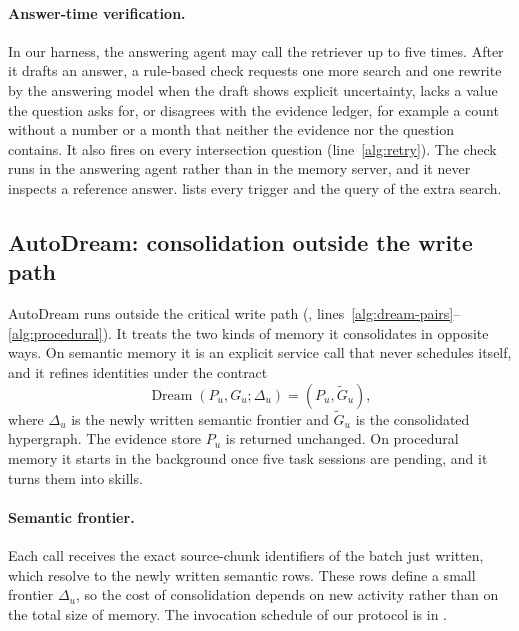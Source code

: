 \paragraph{Answer-time verification.}
In our harness, the answering agent may call the retriever up to five times.
After it drafts an answer, a rule-based check requests one more search and one
rewrite by the answering model when the draft shows explicit uncertainty, lacks a value the question asks for,
or disagrees with the evidence ledger, for example a count without a number or a
month that neither the evidence nor the question contains. It also fires on
every intersection question (line~\ref{alg:retry}). The check runs in the answering agent rather than in
the memory server, and it never inspects a reference answer.
 lists every trigger and the query of the extra
search.

\subsection{AutoDream: consolidation outside the write path}
\label{sec:autodream}

AutoDream runs outside the critical write path
(, lines~\ref{alg:dream-pairs}--\ref{alg:procedural}). It treats
the two kinds of memory it consolidates in opposite ways. On semantic memory it
is an explicit service call that never schedules itself, and it refines
identities under the contract
\begin{equation}
    \operatorname{Dream}(P_u,G_u;\Delta_u)
    = (P_u,\widetilde G_u),
    \label{eq:dream-contract}
\end{equation}
where \(\Delta_u\) is the newly written semantic frontier and \(\widetilde G_u\)
is the consolidated hypergraph. The evidence store \(P_u\) is returned
unchanged. On procedural memory it starts in the background once five task
sessions are pending, and it turns them into skills.

\paragraph{Semantic frontier.}
Each call receives the exact source-chunk identifiers of the batch just
written, which resolve to the newly written semantic rows. These rows define a
small frontier \(\Delta_u\), so the cost of consolidation depends on new
activity rather than on the total size of memory. The invocation schedule of our protocol is in .

